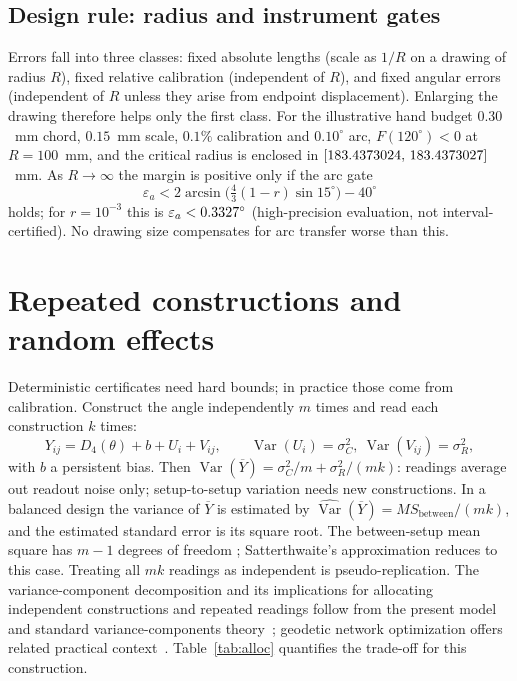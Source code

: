 \documentclass[11pt]{article}
\theoremstyle{definition}
\newcommand{\eps}{\varepsilon}
\newcommand{\Dfour}{D_4}
\DeclareMathOperator{\Var}{Var}
\begin{document}
\subsection{Design rule: radius and instrument gates}\label{sec:design}
Errors fall into three classes: fixed absolute lengths (scale as $1/R$ on a drawing of radius $R$), fixed relative calibration (independent of $R$), and fixed angular errors (independent of $R$ unless they arise from endpoint displacement).
Enlarging the drawing therefore helps only the first class.
For the illustrative hand budget $0.30$~mm chord, $0.15$~mm scale, $0.1\%$ calibration and $0.10^\circ$ arc, $F(120^\circ)<0$ at $R=100$~mm, and the critical radius is enclosed in $[183.4373024,\,183.4373027]$~mm.
As $R\to\infty$ the margin is positive only if the arc gate
\[
\eps_a<2\arcsin\!\Big(\tfrac43(1-r)\sin15^\circ\Big)-40^\circ
\]
holds; for $r=10^{-3}$ this is $\eps_a<\ArcGate^\circ$ (high-precision evaluation, not interval-certified).
No drawing size compensates for arc transfer worse than this.

\begin{table}[h]\centering\small
\resizebox{\textwidth}{!}{}
\caption{Certified thresholds for illustrative combined budgets (hypothetical tolerances, not instrument specifications).}\label{tab:combined}
\end{table}

\section{Repeated constructions and random effects}\label{sec:anova}
Deterministic certificates need hard bounds; in practice those come from calibration.
Construct the angle independently $m$ times and read each construction $k$ times:
\[
Y_{ij}=\Dfour(\theta)+b+U_i+V_{ij},\qquad \Var(U_i)=\sigma_C^2,\ \Var(V_{ij})=\sigma_R^2,
\]
with $b$ a persistent bias. Then $\Var(\overline Y)=\sigma_C^2/m+\sigma_R^2/(mk)$: readings average out readout noise only; setup-to-setup variation needs new constructions.
In a balanced design the variance of $\overline Y$ is estimated by $\widehat{\Var}(\overline Y)=MS_{\text{between}}/(mk)$, and the estimated standard error is its square root. The between-setup mean square has $m-1$ degrees of freedom \cite{searle}; Satterthwaite's approximation \cite{satterthwaite} reduces to this case.
Treating all $mk$ readings as independent is pseudo-replication.
The variance-component decomposition and its implications for allocating independent constructions and repeated readings follow from the present model and standard variance-components theory~\cite{searle}; geodetic network optimization offers related practical context~\cite{grafarend}. Table~\ref{tab:alloc} quantifies the trade-off for this construction.
\end{document}
